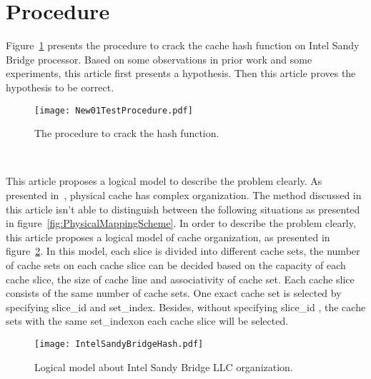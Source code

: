 \documentclass[conference]{IEEEtran}
\newcommand{\SliceID}{slice\_id }
\newcommand{\SetIndex}{set\_index}
\begin{document}
\section{Procedure}
Figure~\ref{fig:TestProcedure} presents the procedure to crack the cache hash function on Intel Sandy Bridge processor. Based on some observations in prior work and some experiments, this article first presents a hypothesis. Then this article proves the hypothesis to be correct. 
\begin{figure}[!htbp]
\centering
\texttt{[image: New01TestProcedure.pdf]}
\caption{The procedure to crack the hash function.}
\label{fig:TestProcedure}
\end{figure}
\begin{figure*}[!htbp]
\centering
{}
	~
        ~
	~
	\caption{Perform data dependent access with different stride. For each stride, there is a point that when the average access latency begins to increase sharply.}
	\label{fig:SetIndexBits}
\end{figure*}

This article proposes a logical model to describe the problem clearly. As presented in~\cite{Multi-core-cache_rajeev}, physical cache has complex organization. The method discussed in this article isn't able to distinguish between the following situations as presented in figure~\ref{fig:PhysicalMappingScheme}. In order to describe the problem clearly, this article proposes a logical model of cache organization, as presented in figure~\ref{fig:LogicalModel}. In this model, each slice is divided into different cache sets, the number of cache sets on each cache slice can be decided based on the capacity of each cache slice, the size of cache line and associativity of cache set. Each cache slice consists of the same number of cache sets. One exact cache set is selected by specifying \SliceID and \SetIndex. Besides, without specifying \SliceID, the cache sets with the same \SetIndex  on each cache slice will be selected. 
\begin{figure}[!htbp]
\centering
\texttt{[image: IntelSandyBridgeHash.pdf]}
\caption{Logical model about Intel Sandy Bridge LLC organization.}
\label{fig:LogicalModel}
\end{figure}
\end{document}
